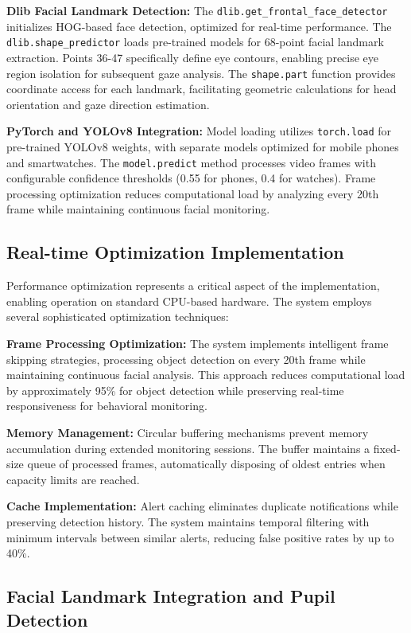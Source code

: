 \documentclass[conference]{IEEEtran}
\begin{document}
\textbf{Dlib Facial Landmark Detection:} The \texttt{dlib.get\_frontal\_face\_detector} initializes HOG-based face detection, optimized for real-time performance. The \texttt{dlib.shape\_predictor} loads pre-trained models for 68-point facial landmark extraction. Points 36-47 specifically define eye contours, enabling precise eye region isolation for subsequent gaze analysis. The \texttt{shape.part} function provides coordinate access for each landmark, facilitating geometric calculations for head orientation and gaze direction estimation.

\textbf{PyTorch and YOLOv8 Integration:} Model loading utilizes \texttt{torch.load} for pre-trained YOLOv8 weights, with separate models optimized for mobile phones and smartwatches. The \texttt{model.predict} method processes video frames with configurable confidence thresholds (0.55 for phones, 0.4 for watches). Frame processing optimization reduces computational load by analyzing every 20th frame while maintaining continuous facial monitoring.

\subsection{Real-time Optimization Implementation}

Performance optimization represents a critical aspect of the implementation, enabling operation on standard CPU-based hardware. The system employs several sophisticated optimization techniques:

\textbf{Frame Processing Optimization:} The system implements intelligent frame skipping strategies, processing object detection on every 20th frame while maintaining continuous facial analysis. This approach reduces computational load by approximately 95\% for object detection while preserving real-time responsiveness for behavioral monitoring.

\textbf{Memory Management:} Circular buffering mechanisms prevent memory accumulation during extended monitoring sessions. The buffer maintains a fixed-size queue of processed frames, automatically disposing of oldest entries when capacity limits are reached.

\textbf{Cache Implementation:} Alert caching eliminates duplicate notifications while preserving detection history. The system maintains temporal filtering with minimum intervals between similar alerts, reducing false positive rates by up to 40\%.

\subsection{Facial Landmark Integration and Pupil Detection}
\end{document}
